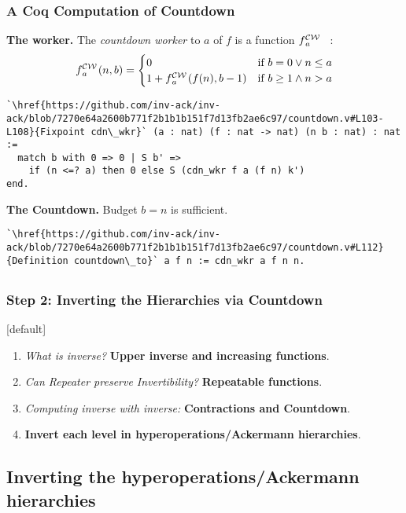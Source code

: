 \begin{frame}[fragile]
\frametitle{A Coq Computation of Countdown}

\textbf{The worker.}
The \emph{countdown worker}
to $a$ of $f$ is a function $\cdw{f}{a}$~~:
\begin{equation*}
\cdw{f}{a}(n, b) = \begin{cases}
0 & \text{if } b = 0 \vee n\le a \\ 1 +\cdw{f}{a}(f(n), b-1) & \text{if } b \ge 1 \wedge n > a
\end{cases}
\end{equation*}

\begin{lstlisting}
`\href{https://github.com/inv-ack/inv-ack/blob/7270e64a2600b771f2b1b1b151f7d13fb2ae6c97/countdown.v#L103-L108}{Fixpoint cdn\_wkr}` (a : nat) (f : nat -> nat) (n b : nat) : nat :=
  match b with 0 => 0 | S b' =>
    if (n <=? a) then 0 else S (cdn_wkr f a (f n) k')
end.
\end{lstlisting}

\bigskip

\pause 
\textbf{The Countdown.} Budget $b = n$ is sufficient.
\begin{lstlisting}
`\href{https://github.com/inv-ack/inv-ack/blob/7270e64a2600b771f2b1b1b151f7d13fb2ae6c97/countdown.v#L112}{Definition countdown\_to}` a f n := cdn_wkr a f n n.
\end{lstlisting}
\end{frame}




\subsection*{}
\begin{frame}
\frametitle{Step 2: Inverting the Hierarchies via \textbf{Countdown}}
[default]

\begin{enumerate}[\bfseries 1.]
	\itemsep 3ex
	\item<done@1->
	\emph{What is inverse?} \textbf{Upper inverse and increasing functions}.
	
	\item<done@1->
	\emph{Can Repeater preserve Invertibility?} \textbf{Repeatable functions}.
	
	\item<done@1->
	\emph{Computing inverse with inverse:} \textbf{Contractions and Countdown}.
	
	\item<come@2->
	\textbf{Invert each level in hyperoperations/Ackermann hierarchies}.
\end{enumerate}
\end{frame}


\subsection{Inverting the hyperoperations/Ackermann hierarchies}

